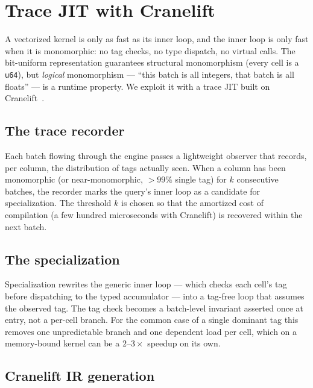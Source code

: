 \documentclass[10pt]{article}
\theoremstyle{definition}
\begin{document}
\section{Trace JIT with Cranelift}
\label{sec:jit}

A vectorized kernel is only as fast as its inner loop, and the inner loop is only fast when it is monomorphic: no tag checks, no type dispatch, no virtual calls. The bit-uniform representation guarantees structural monomorphism (every cell is a \texttt{u64}), but \emph{logical} monomorphism --- ``this batch is all integers, that batch is all floats'' --- is a runtime property. We exploit it with a trace JIT built on Cranelift~\citep{cranelift}.

\subsection{The trace recorder}

Each batch flowing through the engine passes a lightweight observer that records, per column, the distribution of tags actually seen. When a column has been monomorphic (or near-monomorphic, $>99\%$ single tag) for $k$ consecutive batches, the recorder marks the query's inner loop as a candidate for specialization. The threshold $k$ is chosen so that the amortized cost of compilation (a few hundred microseconds with Cranelift) is recovered within the next batch.

\subsection{The specialization}

Specialization rewrites the generic inner loop --- which checks each cell's tag before dispatching to the typed accumulator --- into a tag-free loop that assumes the observed tag. The tag check becomes a batch-level invariant asserted once at entry, not a per-cell branch. For the common case of a single dominant tag this removes one unpredictable branch and one dependent load per cell, which on a memory-bound kernel can be a $2$--$3\times$ speedup on its own.

\subsection{Cranelift IR generation}
\end{document}
